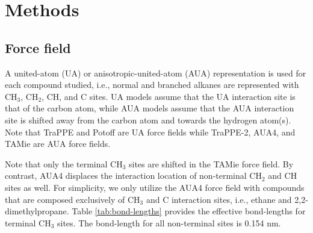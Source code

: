 \documentclass[preprint,review,12pt]{elsarticle}
\begin{document}
	\section{Methods} \label{Methods}
	
	\subsection{Force field} \label{Force Field}
	
	A united-atom (UA) or anisotropic-united-atom (AUA) representation is used for each compound studied, i.e., normal and branched alkanes are represented with CH$_3$, CH$_2$, CH, and C sites. UA models assume that the UA interaction site is that of the carbon atom, while AUA models assume that the AUA interaction site is shifted away from the carbon atom and towards the hydrogen atom(s). Note that TraPPE and Potoff are UA force fields while TraPPE-2, AUA4, and TAMie are AUA force fields. 
	
	
	Note that only the terminal CH$_3$ sites are shifted in the TAMie force field. By contrast, AUA4 displaces the interaction location of non-terminal CH$_2$ and CH sites as well. For simplicity, we only utilize the AUA4 force field with compounds that are composed exclusively of CH$_3$ and C interaction sites, i.e., ethane and 2,2-dimethylpropane. Table \ref{tab:bond-lengths} provides the effective bond-lengths for terminal CH$_3$ sites. The bond-length for all non-terminal sites is 0.154 nm.
	
\end{document}
